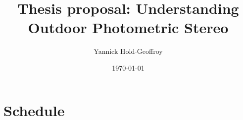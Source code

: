 \documentclass{report}
\title{Thesis proposal: Understanding Outdoor Photometric Stereo}
\author{Yannick Hold-Geoffroy}
\date{\today}
\begin{document}

\maketitle

\tableofcontents

\hypersetup{colorlinks=true,linkcolor=blue}

\newcommand{\boldomega}{\boldsymbol \omega} %
\newcommand{\boldmu}{\boldsymbol \mu} %
\newcommand{\bolddelta}{\boldsymbol \delta} %

\newcommand\norm[1]{\left\lVert#1\right\rVert}

\newcommand\todo[1]{\textcolor{red}{TODO: #1}}

\graphicspath{{figures/}}


%
%








\chapter{Schedule}
\end{document}
